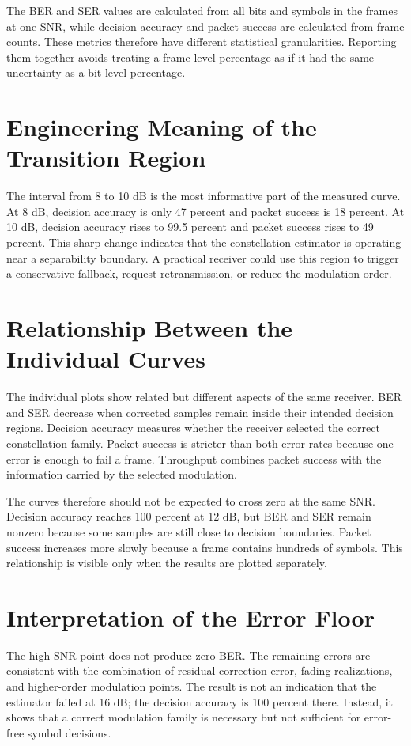 \documentclass[12pt,twoside,openright]{report}
\begin{document}
The BER and SER values are calculated from all bits and symbols in the
frames at one SNR, while decision accuracy and packet success are calculated
from frame counts. These metrics therefore have different statistical
granularities. Reporting them together avoids treating a frame-level
percentage as if it had the same uncertainty as a bit-level percentage.

\section{Engineering Meaning of the Transition Region}
The interval from 8 to 10 dB is the most informative part of the measured
curve. At 8 dB, decision accuracy is only 47 percent and packet success is
18 percent. At 10 dB, decision accuracy rises to 99.5 percent and packet
success rises to 49 percent. This sharp change indicates that the
constellation estimator is operating near a separability boundary. A
practical receiver could use this region to trigger a conservative fallback,
request retransmission, or reduce the modulation order.

\section{Relationship Between the Individual Curves}
The individual plots show related but different aspects of the same
receiver. BER and SER decrease when corrected samples remain inside their
intended decision regions. Decision accuracy measures whether the receiver
selected the correct constellation family. Packet success is stricter than
both error rates because one error is enough to fail a frame. Throughput
combines packet success with the information carried by the selected
modulation.

The curves therefore should not be expected to cross zero at the same SNR.
Decision accuracy reaches 100 percent at 12 dB, but BER and SER remain
nonzero because some samples are still close to decision boundaries. Packet
success increases more slowly because a frame contains hundreds of symbols.
This relationship is visible only when the results are plotted separately.

\section{Interpretation of the Error Floor}
The high-SNR point does not produce zero BER. The remaining errors are
consistent with the combination of residual correction error, fading
realizations, and higher-order modulation points. The result is not an
indication that the estimator failed at 16 dB; the decision accuracy is
100 percent there. Instead, it shows that a correct modulation family is
necessary but not sufficient for error-free symbol decisions.
\end{document}
